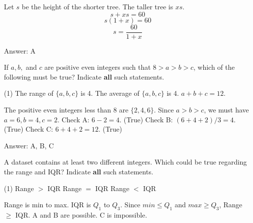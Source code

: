 \documentclass[11pt,paper=a4,answers]{exam}
\begin{document}
\begin{questions}
\begin{solution}
Let $s$ be the height of the shorter tree. The taller tree is $xs$.
\vspace{5pt}
\[ s + xs = 60 \]
\vspace{5pt}
\[ s(1 + x) = 60 \]
\vspace{5pt}
\[ s = \dfrac{60}{1 + x} \]

Answer: \colorbox{yellow!100}{A}
\end{solution}

\vspace{1cm}


\question
If $a, b,$ and $c$ are positive even integers such that $8 > a > b > c$, which of the following must be true?
Indicate \textbf{all} such statements.

\begin{tasks}(1)
\task[A)] The range of $\{a, b, c\}$ is 4.
\task[B)] The average of $\{a, b, c\}$ is 4.
\task[C)] $a + b + c = 12$.
\end{tasks}

\begin{solution}
The positive even integers less than 8 are $\{2, 4, 6\}$.
\vspace{5pt}
Since $a > b > c$, we must have $a = 6, b = 4, c = 2$.
\vspace{5pt}
Check A: $6 - 2 = 4$. (True)
\vspace{5pt}
Check B: $(6 + 4 + 2)/3 = 4$. (True)
\vspace{5pt}
Check C: $6 + 4 + 2 = 12$. (True)

Answer: \colorbox{yellow!100}{A, B, C}
\end{solution}

\vspace{1cm}

\question
A dataset contains at least two different integers. Which could be true regarding the range and IQR?
Indicate \textbf{all} such statements.

\begin{tasks}(1)
\task[A)] Range $>$ IQR
\task[B)] Range $=$ IQR
\task[C)] Range $<$ IQR
\end{tasks}

\begin{solution}
Range is min to max. IQR is $Q_1$ to $Q_3$.
\vspace{5pt}
Since $min \leq Q_1$ and $max \geq Q_3$, Range $\geq$ IQR.
\vspace{5pt}
A and B are possible. C is impossible.


\end{solution}
\end{questions}
\end{document}
